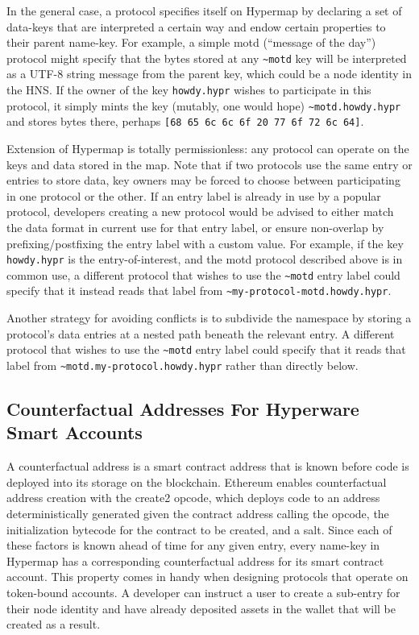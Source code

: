 \documentclass[runningheads]{llncs}
\begin{document}
In the general case, a protocol specifies itself on Hypermap by declaring a set of data-keys that are interpreted a certain way and endow certain properties to their parent name-key.
For example, a simple motd (``message of the day'') protocol might specify that the bytes stored at any \verb|~motd| key will be interpreted as a UTF-8 string message from the parent key, which could be a node identity in the HNS.
If the owner of the key \verb|howdy.hypr| wishes to participate in this protocol, it simply mints the key (mutably, one would hope) \verb|~motd.howdy.hypr| and stores bytes there, perhaps \verb|[68 65 6c 6c 6f 20 77 6f 72 6c 64]|.

Extension of Hypermap is totally permissionless: any protocol can operate on the keys and data stored in the map.
Note that if two protocols use the same entry or entries to store data, key owners may be forced to choose between participating in one protocol or the other.
If an entry label is already in use by a popular protocol, developers creating a new protocol would be advised to either match the data format in current use for that entry label, or ensure non-overlap by prefixing/postfixing the entry label with a custom value.
For example, if the key \verb|howdy.hypr| is the entry-of-interest, and the motd protocol described above is in common use, a different protocol that wishes to use the \verb|~motd| entry label could specify that it instead reads that label from \verb|~my-protocol-motd.howdy.hypr|.

Another strategy for avoiding conflicts is to subdivide the namespace by storing a protocol's data entries at a nested path beneath the relevant entry.
A different protocol that wishes to use the \verb|~motd| entry label could specify that it reads that label from \verb|~motd.my-protocol.howdy.hypr| rather than directly below.

\subsection{Counterfactual Addresses For Hyperware Smart Accounts}

A counterfactual address is a smart contract address that is known before code is deployed into its storage on the blockchain.
Ethereum enables counterfactual address creation with the create2 opcode, which deploys code to an address deterministically generated given the contract address calling the opcode, the initialization bytecode for the contract to be created, and a salt.
Since each of these factors is known ahead of time for any given entry, every name-key in Hypermap has a corresponding counterfactual address for its smart contract account.
This property comes in handy when designing protocols that operate on token-bound accounts.
A developer can instruct a user to create a sub-entry for their node identity and have already deposited assets in the wallet that will be created as a result.
\end{document}
